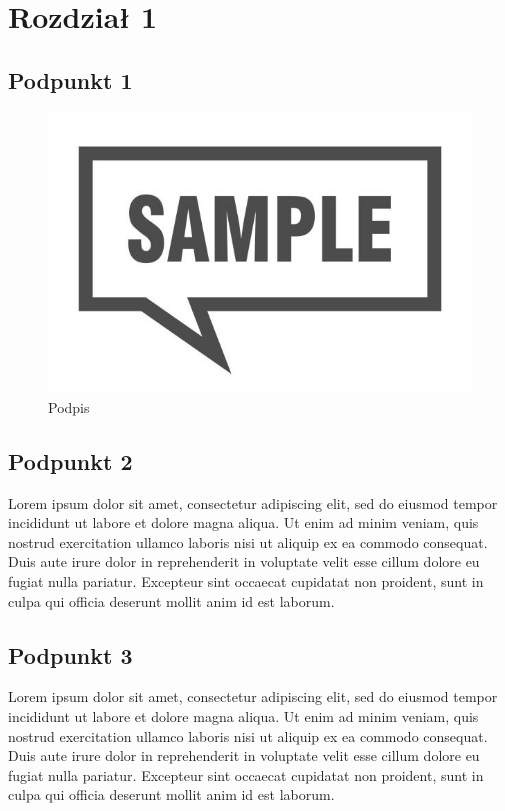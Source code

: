 
\section{Rozdział 1}

\subsection{Podpunkt 1}
\begin{figure}[th]
	\centering
	\includegraphics[width=\textwidth]{tex/img/stock.jpg}
	\caption{Podpis}
	\label{stock}
\end{figure}
\clearpage

\subsection{Podpunkt 2}
Lorem ipsum dolor sit amet, consectetur adipiscing elit, sed do eiusmod tempor incididunt ut labore et dolore magna aliqua. Ut enim ad minim veniam, quis nostrud exercitation ullamco laboris nisi ut aliquip ex ea commodo consequat. Duis aute irure dolor in reprehenderit in voluptate velit esse cillum dolore eu fugiat nulla pariatur. Excepteur sint occaecat cupidatat non proident, sunt in culpa qui officia deserunt mollit anim id est laborum.
\clearpage

\subsection{Podpunkt 3}
Lorem ipsum dolor sit amet, consectetur adipiscing elit, sed do eiusmod tempor incididunt ut labore et dolore magna aliqua. Ut enim ad minim veniam, quis nostrud exercitation ullamco laboris nisi ut aliquip ex ea commodo consequat. Duis aute irure dolor in reprehenderit in voluptate velit esse cillum dolore eu fugiat nulla pariatur. Excepteur sint occaecat cupidatat non proident, sunt in culpa qui officia deserunt mollit anim id est laborum.
\clearpage
